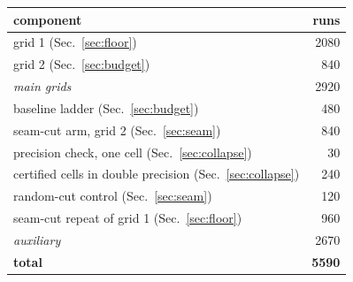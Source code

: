 \begin{tabular}{@{}lr@{}}
\toprule
component & runs \\
\midrule
grid 1 (Sec.~\ref{sec:floor}) & 2080 \\
grid 2 (Sec.~\ref{sec:budget}) & 840 \\
\emph{main grids} & 2920 \\\addlinespace[2pt]
baseline ladder (Sec.~\ref{sec:budget}) & 480 \\
seam-cut arm, grid 2 (Sec.~\ref{sec:seam}) & 840 \\
precision check, one cell (Sec.~\ref{sec:collapse}) & 30 \\
certified cells in double precision (Sec.~\ref{sec:collapse}) & 240 \\
random-cut control (Sec.~\ref{sec:seam}) & 120 \\
seam-cut repeat of grid 1 (Sec.~\ref{sec:floor}) & 960 \\
\emph{auxiliary} & 2670 \\\midrule
\textbf{total} & \textbf{5590} \\
\bottomrule
\end{tabular}

